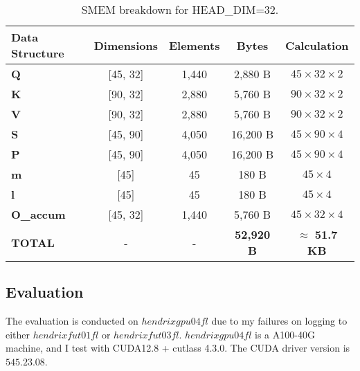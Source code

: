 \documentclass[11pt]{article}
\begin{document}
\begin{table}[h!]
\centering
\begin{tabular}{lcccc}
\toprule
\textbf{Data Structure} & \textbf{Dimensions} & \textbf{Elements} & \textbf{Bytes} & \textbf{Calculation} \\
\midrule
\textbf{Q} & [45, 32] & 1,440 & 2,880 B & $45 \times 32 \times 2$ \\
\textbf{K} & [90, 32] & 2,880 & 5,760 B & $90 \times 32 \times 2$ \\
\textbf{V} & [90, 32] & 2,880 & 5,760 B & $90 \times 32 \times 2$ \\
\textbf{S} & [45, 90] & 4,050 & 16,200 B & $45 \times 90 \times 4$ \\
\textbf{P} & [45, 90] & 4,050 & 16,200 B & $45 \times 90 \times 4$ \\
\textbf{m} & [45] & 45 & 180 B & $45 \times 4$ \\
\textbf{l} & [45] & 45 & 180 B & $45 \times 4$ \\
\textbf{O\_accum} & [45, 32] & 1,440 & 5,760 B & $45 \times 32 \times 4$ \\
\midrule
\textbf{TOTAL} & - & - & \textbf{52,920 B} & $\approx$ \textbf{51.7 KB} \\
\bottomrule
\end{tabular}
\caption{SMEM breakdown for HEAD\_DIM=32.}
\end{table}


\subsection{Evaluation}
The evaluation is conducted on $hendrixgpu04fl$ due to my failures on logging to either $hendrixfut01fl$ or $hendrixfut03fl$. $hendrixgpu04fl$ is a A100-40G machine, and I test with CUDA12.8 + cutlass 4.3.0. The CUDA driver version is $545.23.08$.
\end{document}
